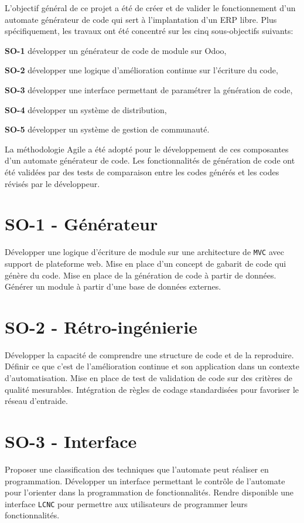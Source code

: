 \label{sec:Theme1} \label{chapitre_methode}

L’objectif général de ce projet a été de créer et de valider le fonctionnement d’un automate générateur de code qui sert à l’implantation d’un ERP libre. Plus spécifiquement, les travaux ont été concentré sur les cinq sous-objectifs suivants:

\textbf{SO-1} développer un générateur de code de module sur Odoo,

\textbf{SO-2} développer une logique d'amélioration continue sur l'écriture du code,

\textbf{SO-3} développer une interface permettant de paramétrer la génération de code,

\textbf{SO-4} développer un système de distribution,

\textbf{SO-5} développer un système de gestion de communauté.

La méthodologie Agile a été adopté pour le développement de ces composantes d'un automate générateur de code. Les fonctionnalités de génération de code ont été validées par des tests de comparaison entre les codes générés et les codes révisés par le développeur.


\section{SO-1 - Générateur}
Développer une logique d’écriture de module sur une architecture de \texttt{MVC} avec support de plateforme web. Mise en place d’un concept de gabarit de code qui génère du code. Mise en place de la génération de code à partir de données. Générer un module à partir d’une base de données externes.

\section{SO-2 - Rétro-ingénierie}
Développer la capacité de comprendre une structure de code et de la reproduire. Définir ce que c’est de l’amélioration continue et son application dans un contexte d’automatisation. Mise en place de test de validation de code sur des critères de qualité mesurables. Intégration de règles de codage standardisées pour favoriser le réseau d’entraide.

\section{SO-3 - Interface}
Proposer une classification des techniques que l’automate peut réaliser en programmation. Développer un interface permettant le contrôle de l’automate pour l’orienter dans la programmation de fonctionnalités. Rendre disponible une interface \texttt{LCNC} pour permettre aux utilisateurs de programmer leurs fonctionnalités.

